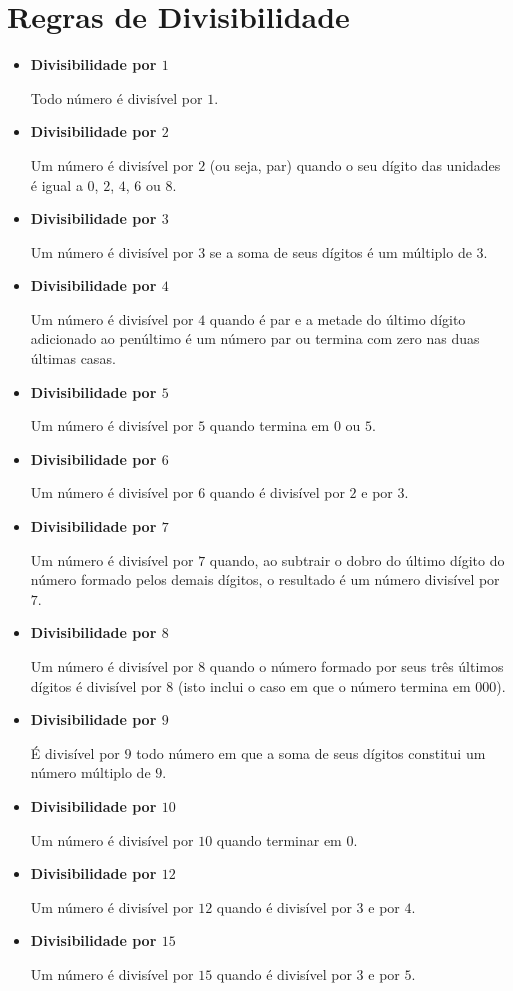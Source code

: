  \newpage
 \section{Regras de Divisibilidade}
 \begin{itemize}
  \item \textbf{Divisibilidade por $1$}

 Todo número é divisível por $1$.

 \item \textbf{Divisibilidade por $2$}

 Um número é divisível por $2$ (ou seja, par) quando o seu dígito das unidades é igual a $0$, $2$, $4$, $6$ ou $8$.

 \item \textbf{Divisibilidade por $3$}

 Um número é divisível por $3$ se a soma de seus dígitos é um múltiplo de $3$.

 \item \textbf{Divisibilidade por $4$}

 Um número é divisível por $4$ quando é par e a metade do último dígito adicionado ao penúltimo é um número par ou termina com zero nas duas últimas casas.

 \item \textbf{Divisibilidade por $5$}

 Um número é divisível por $5$ quando termina em $0$ ou $5$.

 \item \textbf{Divisibilidade por $6$}

 Um número é divisível por $6$ quando é divisível por $2$ e por $3$.

 \item \textbf{Divisibilidade por $7$}

 Um número é divisível por $7$ quando, ao subtrair o dobro do último dígito do número formado pelos demais dígitos, o resultado é um número divisível por $7$.

 \item \textbf{Divisibilidade por $8$}

 Um número é divisível por $8$ quando o número formado por seus três últimos dígitos é divisível por $8$ (isto inclui o caso em que o número termina em $000$).

 \item \textbf{Divisibilidade por $9$}

 É divisível por $9$ todo número em que a soma de seus dígitos constitui um número múltiplo de $9$.

 \item \textbf{Divisibilidade por $10$}

 Um número é divisível por $10$ quando terminar em $0$.

 \item \textbf{Divisibilidade por $12$}

 Um número é divisível por $12$ quando é divisível por $3$ e por $4$.

 \item \textbf{Divisibilidade por $15$}

 Um número é divisível por $15$ quando é divisível por $3$ e por $5$.
 \end{itemize}

